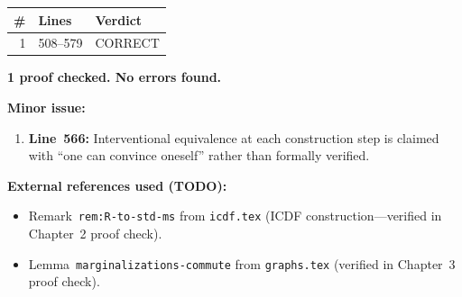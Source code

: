 \documentclass{article}
\begin{document}
\begin{center}
\begin{tabular}{r|l|l}
\textbf{\#} & \textbf{Lines} & \textbf{Verdict} \\ \hline
1 & 508--579 & CORRECT \\
\end{tabular}
\end{center}

\textbf{1 proof checked.  No errors found.}

\bigskip\noindent
\textbf{Minor issue:}
\begin{enumerate}
  \item \textbf{Line~566:} Interventional equivalence at each construction step
    is claimed with ``one can convince oneself'' rather than formally verified.
\end{enumerate}

\bigskip\noindent
\textbf{External references used (TODO):}
\begin{itemize}
  \item Remark~\texttt{rem:R-to-std-ms} from \texttt{icdf.tex}
    (ICDF construction---verified in Chapter~2 proof check).
  \item Lemma~\texttt{marginalizations-commute} from \texttt{graphs.tex}
    (verified in Chapter~3 proof check).
\end{itemize}
\end{document}
